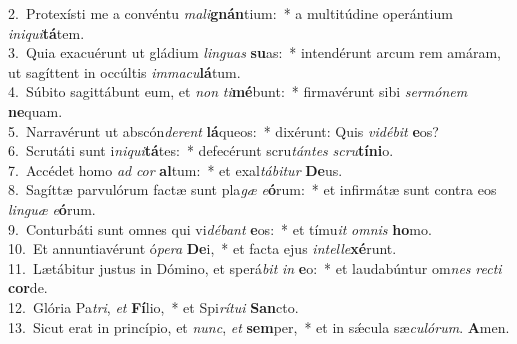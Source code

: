{2.~}Protexísti me a convéntu \textit{ma}\textit{li}\textbf{gnán}tium:~* a multitúdine operántium \textit{i}\textit{ni}\textit{qui}\textbf{tá}tem.\\
{3.~}Quia exacuérunt ut gládium \textit{lin}\textit{guas} \textbf{su}as:~* intendérunt arcum rem amáram, ut sagíttent in occúltis \textit{im}\textit{ma}\textit{cu}\textbf{lá}tum.\\
{4.~}Súbito sagittábunt eum, et \textit{non} \textit{ti}\textbf{mé}bunt:~* firmavérunt sibi \textit{ser}\textit{mó}\textit{nem} \textbf{ne}quam.\\
{5.~}Narravérunt ut abscón\textit{de}\textit{rent} \textbf{lá}queos:~* dixérunt: Quis \textit{vi}\textit{dé}\textit{bit} \textbf{e}os?\\
{6.~}Scrutáti sunt i\textit{ni}\textit{qui}\textbf{tá}tes:~* defecérunt scru\textit{tán}\textit{tes} \textit{scru}\textbf{tí}\textbf{ni}o.\\
{7.~}Accédet homo \textit{ad} \textit{cor} \textbf{al}tum:~* et exal\textit{tá}\textit{bi}\textit{tur} \textbf{De}us.\\
{8.~}Sagíttæ parvulórum factæ sunt pla\textit{gæ} \textit{e}\textbf{ó}rum:~* et infirmátæ sunt contra eos \textit{lin}\textit{guæ} \textit{e}\textbf{ó}rum.\\
{9.~}Conturbáti sunt omnes qui vi\textit{dé}\textit{bant} \textbf{e}os:~* et tímu\textit{it} \textit{om}\textit{nis} \textbf{ho}mo.\\
{10.~}Et annuntiavérunt ó\textit{pe}\textit{ra} \textbf{De}i,~* et facta ejus \textit{in}\textit{tel}\textit{le}\textbf{xé}runt.\\
{11.~}Lætábitur justus in Dómino, et sperá\textit{bit} \textit{in} \textbf{e}o:~* et laudabúntur om\textit{nes} \textit{re}\textit{cti} \textbf{cor}de.\\
{12.~}Glória Pa\textit{tri}, \textit{et} \textbf{Fí}lio,~* et Spi\textit{rí}\textit{tu}\textit{i} \textbf{San}cto.\\
{13.~}Sicut erat in princípio, et \textit{nunc}, \textit{et} \textbf{sem}per,~* et in sǽcula sæ\textit{cu}\textit{ló}\textit{rum}. \textbf{A}men.\\
